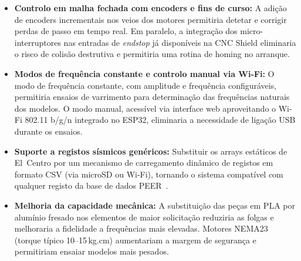 \begin{itemize}
    \item \textbf{Controlo em malha fechada com encoders e fins de curso:} A adição de encoders incrementais nos veios dos motores permitiria detetar e corrigir perdas de passo em tempo real. Em paralelo, a integração dos micro-interruptores nas entradas de \textit{endstop} já disponíveis na CNC Shield eliminaria o risco de colisão destrutiva e permitiria uma rotina de homing no arranque.

    \item \textbf{Modos de frequência constante e controlo manual via Wi-Fi:} O modo de frequência constante, com amplitude e frequência configuráveis, permitiria ensaios de varrimento para determinação das frequências naturais dos modelos. O modo manual, acessível via interface web aproveitando o Wi-Fi 802.11 b/g/n integrado no ESP32, eliminaria a necessidade de ligação USB durante os ensaios.

    \item \textbf{Suporte a registos sísmicos genéricos:} Substituir os arrays estáticos de El~Centro por um mecanismo de carregamento dinâmico de registos em formato CSV (via microSD ou Wi-Fi), tornando o sistema compatível com qualquer registo da base de dados PEER~\cite{PEERDatabase}.

    \item \textbf{Melhoria da capacidade mecânica:} A substituição das peças em PLA por alumínio fresado nos elementos de maior solicitação reduziria as folgas e melhoraria a fidelidade a frequências mais elevadas. Motores NEMA23 (torque típico 10--15\,kg.cm) aumentariam a margem de segurança e permitiriam ensaiar modelos mais pesados.
\end{itemize}
